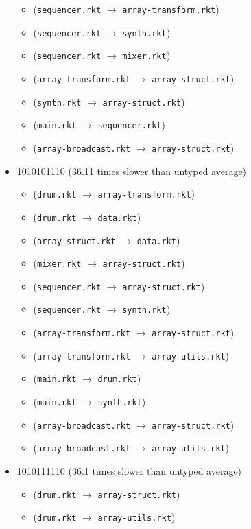 \documentclass{article}
\newcommand{\mono}[1]{\texttt{#1}}
\begin{document}
\begin{itemize}
\begin{itemize}
  \item (\mono{sequencer.rkt} $\rightarrow$ \mono{array-transform.rkt})
  \item (\mono{sequencer.rkt} $\rightarrow$ \mono{synth.rkt})
  \item (\mono{sequencer.rkt} $\rightarrow$ \mono{mixer.rkt})
  \item (\mono{array-transform.rkt} $\rightarrow$ \mono{array-struct.rkt})
  \item (\mono{synth.rkt} $\rightarrow$ \mono{array-struct.rkt})
  \item (\mono{main.rkt} $\rightarrow$ \mono{sequencer.rkt})
  \item (\mono{array-broadcast.rkt} $\rightarrow$ \mono{array-struct.rkt})
  \end{itemize}
\item 1010101110 (36.11 times slower than untyped average)
  \begin{itemize}
  \item (\mono{drum.rkt} $\rightarrow$ \mono{array-transform.rkt})
  \item (\mono{drum.rkt} $\rightarrow$ \mono{data.rkt})
  \item (\mono{array-struct.rkt} $\rightarrow$ \mono{data.rkt})
  \item (\mono{mixer.rkt} $\rightarrow$ \mono{array-struct.rkt})
  \item (\mono{sequencer.rkt} $\rightarrow$ \mono{array-struct.rkt})
  \item (\mono{sequencer.rkt} $\rightarrow$ \mono{synth.rkt})
  \item (\mono{array-transform.rkt} $\rightarrow$ \mono{array-struct.rkt})
  \item (\mono{array-transform.rkt} $\rightarrow$ \mono{array-utils.rkt})
  \item (\mono{main.rkt} $\rightarrow$ \mono{drum.rkt})
  \item (\mono{main.rkt} $\rightarrow$ \mono{synth.rkt})
  \item (\mono{array-broadcast.rkt} $\rightarrow$ \mono{array-struct.rkt})
  \item (\mono{array-broadcast.rkt} $\rightarrow$ \mono{array-utils.rkt})
  \end{itemize}
\item 1010111110 (36.1 times slower than untyped average)
  \begin{itemize}
  \item (\mono{drum.rkt} $\rightarrow$ \mono{array-struct.rkt})
  \item (\mono{drum.rkt} $\rightarrow$ \mono{array-utils.rkt})

\end{itemize}
\end{itemize}
\end{document}
